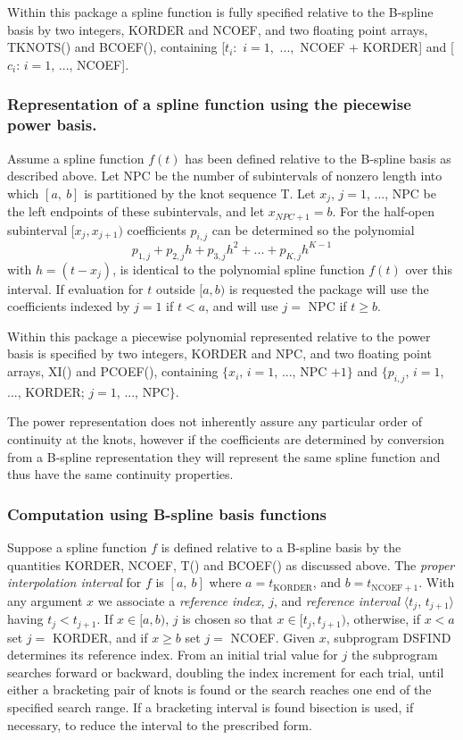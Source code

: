 \documentclass[twoside]{MATH77}
\begin{document}
Within this package a spline function is fully specified relative to the
B-spline basis by two integers, KORDER and NCOEF, and two floating point
arrays, TKNOTS() and BCOEF(), containing [$t_i$:\ $i = 1$,\ ...,\ NCOEF +
KORDER] and [$c_i$: $i = 1$, ..., NCOEF].

\subsubsection{\bf Representation of a spline function using the
piecewise power basis.}

Assume a spline function $f(t)$ has been defined relative to the B-spline
basis as described above. Let NPC be the number of subintervals of nonzero
length into which $[a,~b]$ is partitioned by the knot sequence T. Let $x_j$, $%
j = 1$, ..., NPC be the left endpoints of these subintervals, and let $%
x_{NPC+1} = b$. For the half-open subinterval $[x_j,x_{j+1})$ coefficients $%
p_{i,j}$ can be determined so the polynomial
\begin{equation*}
p_{1,j} + p_{2,j}h + p_{3,j}h^2 + ... + p_{K,j}h^{K-1}
\end{equation*}
with $h = (t-x_j)$, is identical to the polynomial spline function $f(t)$
over this interval. If evaluation for $t$ outside $[a,b)$ is requested the
package will use the coefficients indexed by $j = 1$ if $t < a$, and will
use $j =$ NPC if $t \geq b.$

Within this package a piecewise polynomial represented relative to the power
basis is specified by two integers, KORDER and NPC, and two floating point
arrays, XI() and PCOEF(), containing $\{x_i$, $i = 1$, ..., NPC $+1\}$ and $%
\{p_{i,j}$, $i = 1$, ..., KORDER; $j = 1$, ..., NPC$\}.$

The power representation does not inherently assure any particular order of
continuity at the knots, however if the coefficients are determined by
conversion from a B-spline representation they will represent the same
spline function and thus have the same continuity properties.

\subsubsection{Computation using B-spline basis functions}

Suppose a spline function $f$ is defined relative to a B-spline basis by the
quantities KORDER, NCOEF, T() and BCOEF() as discussed above. The {\em %
proper interpolation interval} for $f$ is $[a,~b]$ where $a = t_{\text{KORDER}%
}$, and $b = t_{\text{NCOEF}+1}$. With any argument $x$ we associate a {\em %
reference index,} $j$, and {\em reference interval} $\langle t_j$, $%
t_{j+1}\rangle $ having $t_j < t_{j+1}$. If $x \in [a,b)$, $j$ is chosen so
that $x \in [t_j,t_{j+1})$, otherwise, if $x < a$ set $j =$ KORDER, and if $%
x \geq b$ set $j =$ NCOEF. Given $x$, subprogram DSFIND determines its
reference index. From an initial trial value for $j$ the subprogram searches
forward or backward, doubling the index increment for each trial, until
either a bracketing pair of knots is found or the search reaches one end of
the specified search range. If a bracketing interval is found bisection is
used, if necessary, to reduce the interval to the prescribed form.
\end{document}
